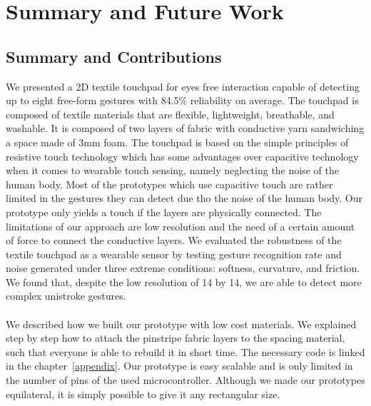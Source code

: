 %

\chapter{Summary and Future Work}
\label{summaryandfuturework}

\section{Summary and Contributions}
\label{summaryandfuturework.summary}
We presented a 2D textile touchpad for eyes free interaction capable of detecting up to eight free-form gestures with 84.5\% reliability on average. The touchpad is composed of textile materials that are flexible, lightweight, breathable, and washable. It is composed of two layers of fabric with conductive yarn sandwiching a space made of 3mm foam. The touchpad is based on the simple principles of resistive touch technology which has some advantages over capacitive technology when it comes to wearable touch sensing, namely neglecting the noise of the human body. Most of the prototypes which use capacitive touch are rather limited in the gestures they can detect due tho the noise of the human body. Our prototype only yields a touch if the layers are physically connected. The limitations of our approach are low resolution and the need of a certain amount of force to connect the conductive layers. We evaluated the robustness of the textile touchpad as a wearable sensor by testing gesture recognition rate and noise generated under three extreme conditions: softness, curvature, and friction. We found that, despite the low resolution of 14 by 14, we are able to detect more complex unistroke gestures.
\\ \\
We described how we built our prototype with low cost materials. We explained step by step how to attach the pinstripe fabric layers to the spacing material, such that everyone is able to rebuild it in short time. The necessary code is linked in the chapter~\ref{appendix}. Our prototype is easy scalable and is only limited in the number of pins of the used microcontroller. Although we made our prototypes equilateral, it is simply possible to give it any rectangular size. 
\\
